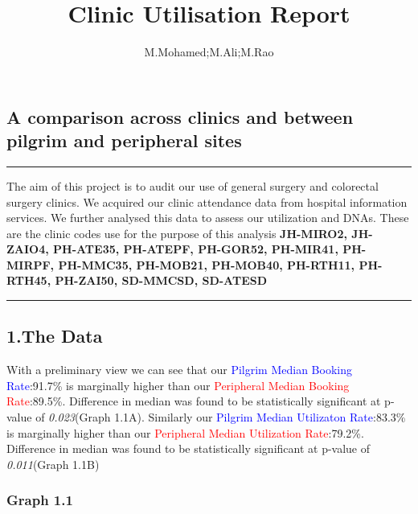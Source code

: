 \documentclass[]{article}
\title{Clinic Utilisation Report}
\author{M.Mohamed;M.Ali;M.Rao}
\date{}
\begin{document}
\maketitle

{
\setcounter{tocdepth}{2}
\tableofcontents
}
\hypertarget{a-comparison-across-clinics-and-between-pilgrim-and-peripheral-sites}{%
\subsection{A comparison across clinics and between pilgrim and
peripheral
sites}\label{a-comparison-across-clinics-and-between-pilgrim-and-peripheral-sites}}

\begin{center}\rule{0.5\linewidth}{0.5pt}\end{center}

The aim of this project is to audit our use of general surgery and
colorectal surgery clinics. We acquired our clinic attendance data from
hospital information services. We further analysed this data to assess
our utilization and DNAs. These are the clinic codes use for the purpose
of this analysis \textbf{JH-MIRO2, JH-ZAIO4, PH-ATE35, PH-ATEPF,
PH-GOR52, PH-MIR41, PH-MIRPF, PH-MMC35, PH-MOB21, PH-MOB40, PH-RTH11,
PH-RTH45, PH-ZAI50, SD-MMCSD, SD-ATESD}

\begin{center}\rule{0.5\linewidth}{0.5pt}\end{center}

\newpage

\hypertarget{the-data}{%
\subsection{1.The Data}\label{the-data}}

With a preliminary view we can see that our \textcolor{blue}{Pilgrim
Median Booking Rate}:91.7\% is marginally higher than our
\textcolor{red}{Peripheral Median Booking Rate}:89.5\%. Difference in
median was found to be statistically significant at p-value of
\emph{0.023}(Graph 1.1A). Similarly our \textcolor{blue}{Pilgrim Median
Utilizaton Rate}:83.3\% is marginally higher than our
\textcolor{red}{Peripheral Median Utilization Rate}:79.2\%. Difference
in median was found to be statistically significant at p-value of
\emph{0.011}(Graph 1.1B)

\hypertarget{graph-1.1}{%
\subsubsection{Graph 1.1}\label{graph-1.1}}
\end{document}
